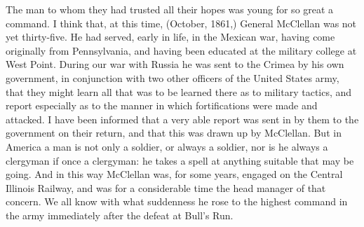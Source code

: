 The man to whom they had trusted all their hopes was young for so
great a command.  I think that, at this time, (October, 1861,)
General McClellan was not yet thirty-five.  He had served, early in
life, in the Mexican war, having come originally from Pennsylvania,
and having been educated at the military college at West Point.
During our war with Russia he was sent to the Crimea by his own
government, in conjunction with two other officers of the United
States army, that they might learn all that was to be learned there
as to military tactics, and report especially as to the manner in
which fortifications were made and attacked.  I have been informed
that a very able report was sent in by them to the government on
their return, and that this was drawn up by McClellan.  But in
America a man is not only a soldier, or always a soldier, nor is he
always a clergyman if once a clergyman: he takes a spell at
anything suitable that may be going.  And in this way McClellan
was, for some years, engaged on the Central Illinois Railway, and
was for a considerable time the head manager of that concern.  We
all know with what suddenness he rose to the highest command in the
army immediately after the defeat at Bull's Run.

